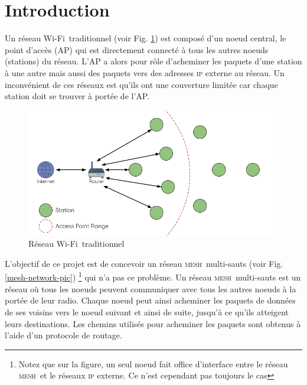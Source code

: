 \documentclass[a4paper, 12pt]{report}
\newcommand{\mesh}{\textsc{mesh}}
\newcommand{\wifi}{Wi-Fi}
\begin{document}
\chapter*{Introduction}
    Un réseau \wifi\ traditionnel (voir Fig. \ref{traditional-network-pic}) est composé
    d'un noeud central, le point d'accès (AP) qui est
    directement connecté à tous les autres noeuds (stations) du réseau.
    L'AP a alors pour rôle d'acheminer les paquets d'une station à une autre
    mais aussi des paquets vers des adresses \textsc{ip} externe au réseau.
    Un inconvénient de ces réseaux est qu'ils ont une couverture limitée car chaque station
    doit se trouver à portée de l'AP.\\

    \begin{figure}[H]
        \centering
        \includegraphics[scale=0.4]{images/traditional-network-architecture.png}
        \caption{Réseau \wifi\ traditionnel \cite{esp-mesh_w}}
        \label{traditional-network-pic}
    \end{figure}

    L'objectif de ce projet est de concevoir un réseau \mesh\ multi-sauts (voir Fig. \ref{mesh-network-pic})
    \footnote{Notez que sur la figure, un seul noeud fait office d'interface
    entre le réseau \mesh\ et le réseaux \textsc{ip} externe. Ce n'est cependant pas toujours
    le cas} qui n'a pas ce problème. 
    Un réseau \mesh\ multi-sauts est un réseau où tous les noeuds peuvent communiquer avec tous les
    autres noeuds à la portée de leur radio. Chaque noeud peut ainsi acheminer
    les paquets de données de ses voisins vers le noeud suivant et ainsi de suite, jusqu'à ce qu'ils
    atteigent leurs destinations. Les chemins utilisés pour acheminer les paquets sont obtenus à l'aide
    d'un protocole de routage.\\
\end{document}
